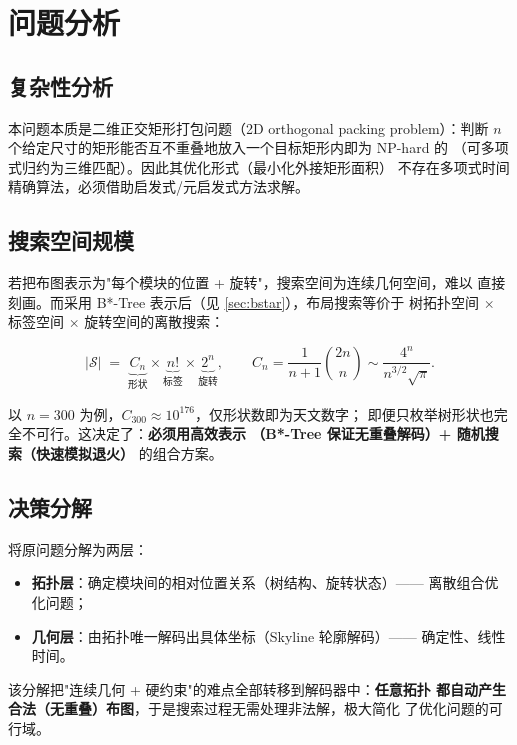 \documentclass[12pt,a4paper]{article}
\begin{document}
\section{问题分析}

\subsection{复杂性分析}

本问题本质是二维正交矩形打包问题（2D orthogonal packing problem）：判断
$n$ 个给定尺寸的矩形能否互不重叠地放入一个目标矩形内即为 NP-hard 的
（可多项式归约为三维匹配）。因此其优化形式（最小化外接矩形面积）
不存在多项式时间精确算法，必须借助启发式/元启发式方法求解。

\subsection{搜索空间规模}

若把布图表示为"每个模块的位置 + 旋转"，搜索空间为连续几何空间，难以
直接刻画。而采用 B*-Tree 表示后（见 \ref{sec:bstar}），布局搜索等价于
树拓扑空间 $\times$ 标签空间 $\times$ 旋转空间的离散搜索：

\[
|\mathcal{S}| \;=\; \underbrace{C_n}_{\text{形状}} \times
\underbrace{n!}_{\text{标签}} \times \underbrace{2^n}_{\text{旋转}},
\qquad C_n = \frac{1}{n+1}\binom{2n}{n} \sim \frac{4^n}{n^{3/2}\sqrt{\pi}}.
\]

以 $n=300$ 为例，$C_{300} \approx 10^{176}$，仅形状数即为天文数字；
即便只枚举树形状也完全不可行。这决定了：\textbf{必须用高效表示
（B*-Tree 保证无重叠解码）+ 随机搜索（快速模拟退火）} 的组合方案。

\subsection{决策分解}

将原问题分解为两层：

\begin{itemize}
    \item \textbf{拓扑层}：确定模块间的相对位置关系（树结构、旋转状态）——
          离散组合优化问题；
    \item \textbf{几何层}：由拓扑唯一解码出具体坐标（Skyline 轮廓解码）——
          确定性、线性时间。
\end{itemize}

该分解把"连续几何 + 硬约束"的难点全部转移到解码器中：\textbf{任意拓扑
都自动产生合法（无重叠）布图}，于是搜索过程无需处理非法解，极大简化
了优化问题的可行域。
\end{document}

